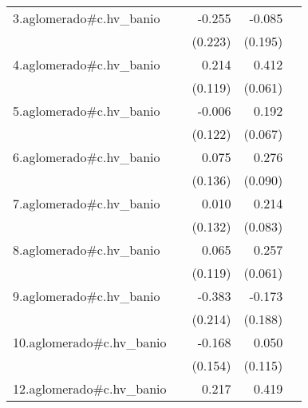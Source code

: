 {\begin{longtable}{l*{4}{D{.}{.}{-1}}}
\addlinespace
3.aglomerado#c.hv\_banio&                     &      -0.255         &      -0.085         &                     \\
            &                     &     (0.223)         &     (0.195)         &                     \\
\addlinespace
4.aglomerado#c.hv\_banio&                     &       0.214         &       0.412\sym{***}&                     \\
            &                     &     (0.119)         &     (0.061)         &                     \\
\addlinespace
5.aglomerado#c.hv\_banio&                     &      -0.006         &       0.192\sym{**} &                     \\
            &                     &     (0.122)         &     (0.067)         &                     \\
\addlinespace
6.aglomerado#c.hv\_banio&                     &       0.075         &       0.276\sym{**} &                     \\
            &                     &     (0.136)         &     (0.090)         &                     \\
\addlinespace
7.aglomerado#c.hv\_banio&                     &       0.010         &       0.214\sym{**} &                     \\
            &                     &     (0.132)         &     (0.083)         &                     \\
\addlinespace
8.aglomerado#c.hv\_banio&                     &       0.065         &       0.257\sym{***}&                     \\
            &                     &     (0.119)         &     (0.061)         &                     \\
\addlinespace
9.aglomerado#c.hv\_banio&                     &      -0.383         &      -0.173         &                     \\
            &                     &     (0.214)         &     (0.188)         &                     \\
\addlinespace
10.aglomerado#c.hv\_banio&                     &      -0.168         &       0.050         &                     \\
            &                     &     (0.154)         &     (0.115)         &                     \\
\addlinespace
12.aglomerado#c.hv\_banio&                     &       0.217         &       0.419\sym{***}&                     \\

\end{longtable}}
